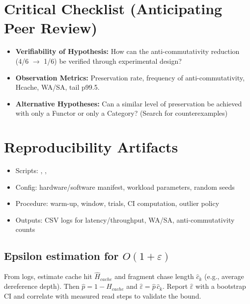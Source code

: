 \documentclass[10pt]{article}
\begin{document}
\section{Critical Checklist (Anticipating Peer Review)}
\begin{itemize}
    \item \textbf{Verifiability of Hypothesis:} How can the anti-commutativity reduction (4/6 $\to$ 1/6) be verified through experimental design?
    \item \textbf{Observation Metrics:} Preservation rate, frequency of anti-commutativity, Hcache, WA/SA, tail p99.5.
    \item \textbf{Alternative Hypotheses:} Can a similar level of preservation be achieved with only a Functor or only a Category? (Search for counterexamples)
\end{itemize}

\section{Reproducibility Artifacts}\label{app:repro}
\begin{itemize}[nosep]
    \item Scripts: \texttt{}, \texttt{}, \texttt{}
    \item Config: hardware/software manifest, workload parameters, random seeds
    \item Procedure: warm-up, window, trials, CI computation, outlier policy
    \item Outputs: CSV logs for latency/throughput, WA/SA, anti-commutativity counts
\end{itemize}

\subsection*{Epsilon estimation for $O(1{+}\varepsilon)$}
From logs, estimate cache hit $\hat H_{cache}$ and fragment chase length $\hat c_k$ (e.g., average dereference depth). Then $\hat p=1-\hat H_{cache}$ and $\hat\varepsilon=\hat p\,\hat c_k$. Report $\hat\varepsilon$ with a bootstrap CI and correlate with measured read steps to validate the bound.
\end{document}
